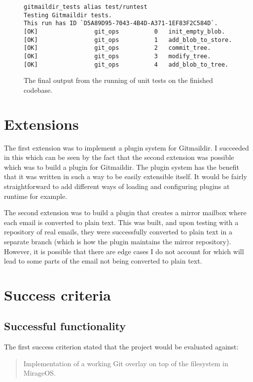 \begin{figure}[h]
\centering
\begin{Verbatim}
gitmaildir_tests alias test/runtest
Testing Gitmaildir tests.
This run has ID `D5A89D95-7043-4B4D-A371-1EF83F2C584D`.
[OK]                git_ops          0   init_empty_blob.
[OK]                git_ops          1   add_blob_to_store.
[OK]                git_ops          2   commit_tree.
[OK]                git_ops          3   modify_tree.
[OK]                git_ops          4   add_blob_to_tree.
\end{Verbatim}
\caption{The final output from the running of unit tests on the finished codebase.}
\label{fig:unittests}
\end{figure}

\section{Extensions}

The first extension was to implement a plugin system for Gitmaildir. I succeeded in this which can be seen by the fact that the second extension was possible which was to build a plugin for Gitmaildir. The plugin system has the benefit that it was written in such a way to be easily extensible itself. It would be fairly straightforward to add different ways of loading and configuring plugins at runtime for example.

The second extension was to build a plugin that creates a mirror mailbox where each email is converted to plain text. This was built, and upon testing with a repository of real emails, they were successfully converted to plain text in a separate branch (which is how the plugin maintains the mirror repository). However, it is possible that there are edge cases I do not account for which will lead to some parts of the email not being converted to plain text.

\section{Success criteria}

\subsection{Successful functionality}

The first success criterion stated that the project would be evaluated against:

\begin{quote}
  Implementation of a working Git overlay on top of the filesystem in MirageOS.
\end{quote}

